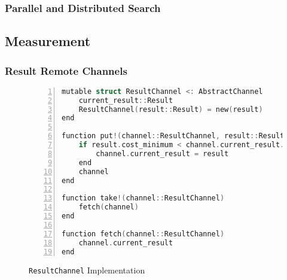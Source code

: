 \subsubsection{Parallel and Distributed Search}

\subsection{Measurement}
\label{sec:nodal-measurement}

\subsubsection{Result Remote Channels}

\begin{figure}[htpb]
    \begin{minipage}{\linewidth}
    \begin{lstlisting}[language=C, basicstyle=\ttfamily\scriptsize,
        numbers=left,
        frame=no, showspaces=false, showstringspaces=false,
        numberstyle=\scriptsize,
        xleftmargin=1.5cm,
        keywords={%
            @spawnat, remotecall, Nullable, Any,
            @fetch, Future, Array, Float64, julia,
            while, true, function, end, put!,
            take!, sleep, RemoteChannel, Channel,
            Int, Tuple, const, addprocs, @schedule,
            @everywhere, for, in, myid, @async,
            remote_do, workers, Result, Real,
            AbstractFloat, deepcopy, rand, exp, true,
            Function, false, Run, mutable, struct,
            ResultChannel, AbstractChannel, return%
        },
        otherkeywords={::, \&, \*, +, -, /, [, ], >, <, put!, take!, neighbor!,
                       update!}
    ]
mutable struct ResultChannel <: AbstractChannel
    current_result::Result
    ResultChannel(result::Result) = new(result)
end

function put!(channel::ResultChannel, result::Result)
    if result.cost_minimum < channel.current_result.cost_minimum
        channel.current_result = result
    end
    channel
end

function take!(channel::ResultChannel)
    fetch(channel)
end

function fetch(channel::ResultChannel)
    channel.current_result
end
    \end{lstlisting}
    \end{minipage}
    \caption{\texttt{ResultChannel} Implementation}
    \label{fig:resultchannel}
\end{figure}


